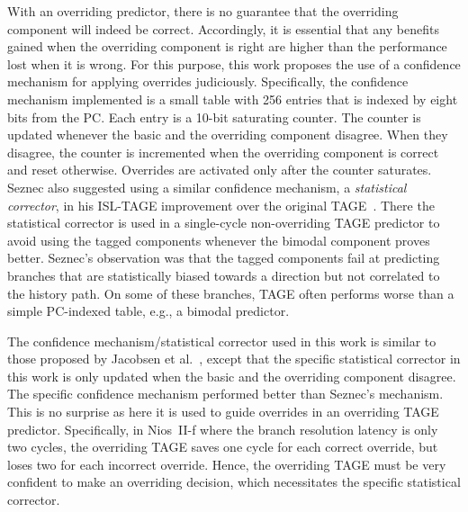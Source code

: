 With an overriding predictor, there is no guarantee that the overriding component will indeed be correct. Accordingly, it is essential that any benefits gained when the overriding component is right are higher than the performance lost when it is wrong. For this purpose, this work proposes the use of a confidence mechanism for applying overrides judiciously. Specifically, the confidence mechanism implemented is a small table with 256 entries that is indexed by eight bits from the PC. Each entry is a 10-bit saturating counter.  The counter is updated whenever the basic and the overriding component disagree. When they disagree, the counter is incremented when the overriding component is correct and reset otherwise. Overrides are activated only after the counter saturates. Seznec also suggested using a similar confidence mechanism, a \textit{statistical corrector}, in his ISL-TAGE improvement over the original TAGE~\cite{isltage}.  There the statistical corrector is used in a single-cycle non-overriding TAGE predictor to avoid using the tagged components whenever the bimodal component proves better.  Seznec's observation was that the tagged components fail at predicting branches that are statistically biased towards a direction but not correlated to the history path. On some of these branches, TAGE often performs worse than a simple PC-indexed table, e.g., a bimodal predictor.

The confidence mechanism/statistical corrector used in this work is similar to those proposed by Jacobsen et al.~\cite{confidence}, except that the specific statistical corrector in this work is only updated when the basic and the overriding component disagree. The specific confidence mechanism performed better than Seznec's mechanism. This is no surprise as here it is used to guide overrides in an overriding TAGE predictor. Specifically, in Nios~II-f where the branch resolution latency is only two cycles, the overriding TAGE saves one cycle for each correct override, but loses two for each incorrect override.
Hence, the overriding TAGE must be very confident to make an overriding decision, which necessitates the specific statistical corrector.


